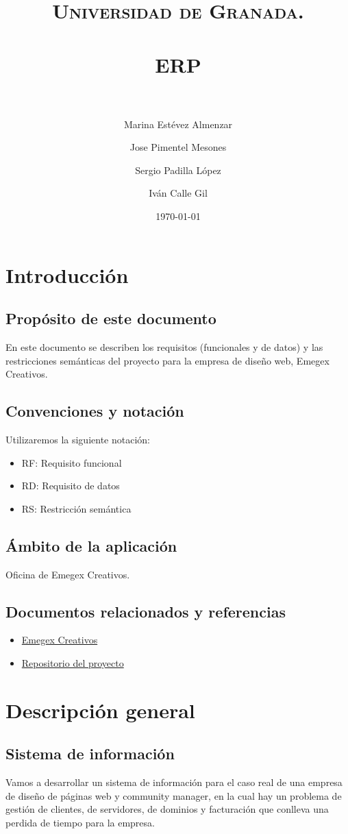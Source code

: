 \documentclass[paper=a4, fontsize=11pt, spanish]{scrartcl}
\title{
  \normalfont \normalsize
  \textsc{Universidad de Granada.} \\ [25pt]
  \horrule{0.5pt} \\[0.4cm]
  \huge ERP \\
  \horrule{2pt} \\[0.5cm]
}
\author{Marina Estévez Almenzar\\
\and
Jose Pimentel Mesones\\
\and
Sergio Padilla López\\
\and
Iván Calle Gil\\}
\date{\normalsize\today}
\begin{document}
\maketitle
\newpage

\tableofcontents

\newpage

\section{Introducción}
\subsection{Propósito de este documento}
\setlength{\parindent}{3em} En este documento se describen los requisitos (funcionales y de datos) y las restricciones
semánticas del proyecto para la empresa de diseño web, Emegex Creativos.
\subsection{Convenciones y notación}
\setlength{\parindent}{0em} Utilizaremos la siguiente notación:
\begin{itemize}
\item RF: Requisito funcional
\item RD: Requisito de datos
\item RS: Restricción semántica
\end{itemize}

\subsection{Ámbito de la aplicación}
\setlength{\parindent}{3em} Oficina de Emegex Creativos.

\subsection{Documentos relacionados y referencias}
\begin{itemize}
\item \href{http://emegex.com}{Emegex Creativos}
\item \href{https://github.com/SergioPadilla/ERP}{Repositorio del proyecto}
\end{itemize}

\section{Descripción general}
\subsection{Sistema de información}
\setlength{\parindent}{3em} Vamos a desarrollar un sistema de información para el caso real de una empresa de diseño de páginas web y community manager, en la cual hay un problema de gestión de clientes, de servidores, de dominios y facturación que conlleva una perdida de tiempo para la empresa.
\end{document}
